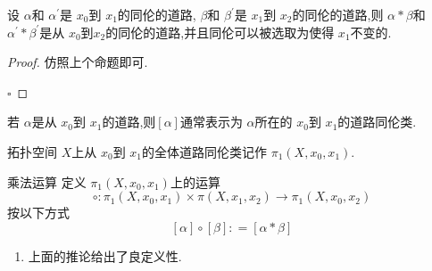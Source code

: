 \documentclass[../../几何与拓扑.tex]{subfiles}
\begin{document}
\begin{corollary}
    设 \(  \alpha   \)和 \(  \alpha ^{\prime}   \)是 \(  x_0  \)到 \(  x_1  \)的同伦的道路, \(  \beta   \)和 \(  \beta ^{\prime}   \)是
    \(  x_1  \)到 \(  x_2  \)的同伦的道路,则 \(  \alpha *\beta   \)和 \(   \alpha ^{\prime} *\beta ^{\prime}   \)是从 \(  x_0  \)到\(  x_2  \)的同伦的道路,并且同伦可以被选取为使得 \(  x_1  \)不变的.             
\end{corollary}
\begin{proof}

    仿照上个命题即可.

    \hfill $\square$
\end{proof}


\begin{definition}
    若 \(  \alpha   \)是从 \(  x_0  \)到 \(  x_1  \)的道路,则\(  [ \alpha ]  \)通常表示为 \(  \alpha   \)所在的 \(  x_0  \)到 \(  x_1  \)的道路同伦类.  
    
    拓扑空间 \(  X  \)上从 \(  x_0  \)到 \(  x_1  \)的全体道路同伦类记作 \(  \pi _1 \left( X,x_0,x_1 \right)   \).    
\end{definition}

\begin{definition}{乘法运算}
    定义 \(  \pi _1 \left( X,x_0,x_1 \right)   \)上的运算 \[
    \circ : \pi _1 \left( X,x_0,x_1 \right)\times \pi \left( X,x_1,x_2 \right)\to \pi _1 \left( X,x_0,x_2 \right)   
    \] 按以下方式 \[
    [ \alpha ]\circ [ \beta ]: =  [ \alpha *\beta ]
    \]
\end{definition}

\begin{remark}
    \begin{enumerate}
        \item 上面的推论给出了良定义性.
    \end{enumerate}
    
\end{remark}
\end{document}

